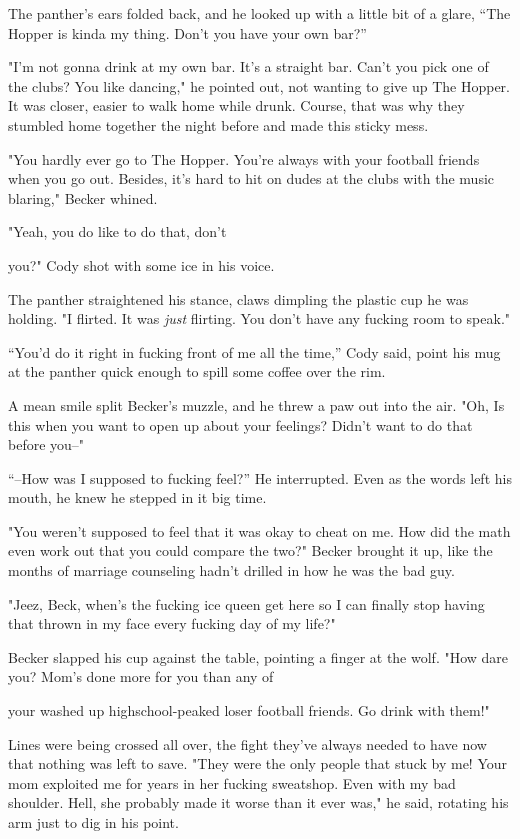 The panther's ears folded back, and he looked up with a little bit of a
glare, ``The Hopper is kinda my thing. Don't you have your own bar?''

"I'm not gonna drink at my own bar. It's a straight bar. Can't you pick
one of the clubs? You like dancing," he pointed out, not wanting to give
up The Hopper. It was closer, easier to walk home while drunk. Course,
that was why they stumbled home together the night before and made this
sticky mess.

"You hardly ever go to The Hopper. You're always with your football
friends when you go out. Besides, it's hard to hit on dudes at the clubs
with the music blaring," Becker whined.

"Yeah, you do like to do that, don't

you?" Cody shot with some ice in his voice.

The panther straightened his stance, claws dimpling the plastic cup he
was holding. "I flirted. It was \emph{just} flirting. You don't have any
fucking room to speak."

``You'd do it right in fucking front of me all the time,'' Cody said,
point his mug at the panther quick enough to spill some coffee over the
rim.

A mean smile split Becker's muzzle, and he threw a paw out into the air.
"Oh, Is this when you want to open up about your feelings? Didn't want
to do that before you--"

``--How was I supposed to fucking feel?'' He interrupted. Even as the
words left his mouth, he knew he stepped in it big time.

"You weren't supposed to feel that it was okay to cheat on me. How did
the math even work out that you could compare the two?" Becker brought
it up, like the months of marriage counseling hadn't drilled in how he
was the bad guy.

"Jeez, Beck, when's the fucking ice queen get here so I can finally stop
having that thrown in my face every fucking day of my life?"

Becker slapped his cup against the table, pointing a finger at the wolf.
"How dare you? Mom's done more for you than any of

your washed up highschool-peaked loser football friends. Go drink with
them!"

Lines were being crossed all over, the fight they've always needed to
have now that nothing was left to save. "They were the only people that
stuck by me! Your mom exploited me for years in her fucking sweatshop.
Even with my bad shoulder. Hell, she probably made it worse than it ever
was," he said, rotating his arm just to dig in his point.

